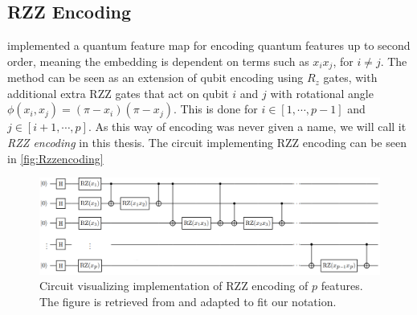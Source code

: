 



\subsection{RZZ Encoding}\label{sec:RZZencoding}
\citet{abbas2020power} implemented a quantum feature map for encoding quantum features up to second order, meaning the embedding is dependent on terms such as $x_i x_j$, for $i\neq j$. The method can be seen as an extension of qubit encoding using $R_z$ gates, with additional extra RZZ gates that act on qubit $i$ and $j$ with rotational angle $\phi(x_i, x_j) = (\pi - x_i)(\pi - x_j)$. This is done for $i\in [1, \cdots, p-1]$ and $j\in [i+1, \cdots, p]$. As this way of encoding was never given a name, we will call it \emph{RZZ encoding} in this thesis. The circuit implementing RZZ encoding can be seen in \autoref{fig:Rzzencoding}

\begin{figure}[H]
    \centering
    \includegraphics[width=14cm]{latex/figures/Rzz_encoding.png}
    \caption{Circuit visualizing implementation of RZZ encoding of $p$ features. The figure is retrieved from \cite{abbas2020power} and adapted to fit our notation.}
    \label{fig:Rzzencoding}
\end{figure}

